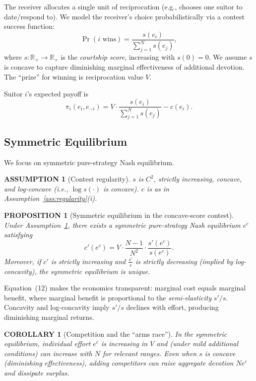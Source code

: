 \documentclass[AER]{AEA}
\newtheorem{proposition}{PROPOSITION}
\newtheorem{corollary}{COROLLARY}
\newtheorem{assumption}{ASSUMPTION}
\begin{document}
The receiver allocates a single unit of reciprocation (e.g., chooses one suitor to
date/respond to). We model the receiver's choice probabilistically via a contest success
function:
\begin{equation}
  \Pr(i \text{ wins}) = \frac{s(e_i)}{\sum_{j=1}^N s(e_j)},
\end{equation}
where $s : \mathbb{R}_+ \to \mathbb{R}_+$ is the \textit{courtship score}, increasing
with $s(0) = 0$. We assume $s$ is concave to capture diminishing marginal effectiveness
of additional devotion. The ``prize'' for winning is reciprocation value $V$.

Suitor $i$'s expected payoff is
\begin{equation}
  \pi_i(e_i, e_{-i}) = V \cdot \frac{s(e_i)}{\sum_{j=1}^N s(e_j)} - c(e_i).
\end{equation}

\subsection{Symmetric Equilibrium}

We focus on symmetric pure-strategy Nash equilibrium.

\begin{assumption}[Contest regularity]\label{ass:contest}
  $s$ is $C^2$, strictly increasing, concave, and log-concave (i.e., $\log s(\cdot)$ is
  concave). $c$ is as in Assumption~\ref{ass:regularity}(i).
\end{assumption}

\begin{proposition}[Symmetric equilibrium in the concave-score contest]\label{prop:contest}
  Under Assumption~\ref{ass:contest}, there exists a symmetric pure-strategy Nash
  equilibrium $e^c$ satisfying
  \begin{equation}
    c'(e^c) = V \cdot \frac{N-1}{N^2} \cdot \frac{s'(e^c)}{s(e^c)}.
  \end{equation}
  Moreover, if $c'$ is strictly increasing and $\frac{s'}{s}$ is strictly decreasing
  (implied by log-concavity), the symmetric equilibrium is unique.
\end{proposition}

Equation~(12) makes the economics transparent: marginal cost equals marginal benefit,
where marginal benefit is proportional to the \textit{semi-elasticity} $s'/s$. Concavity
and log-concavity imply $s'/s$ declines with effort, producing diminishing marginal
returns.

\begin{corollary}[Competition and the ``arms race'']\label{cor:arms}
  In the symmetric equilibrium, individual effort $e^c$ is increasing in $V$ and (under
  mild additional conditions) can increase with $N$ for relevant ranges. Even when $s$ is
  concave (diminishing effectiveness), adding competitors can raise aggregate devotion
  $Ne^c$ and dissipate surplus.
\end{corollary}
\end{document}
